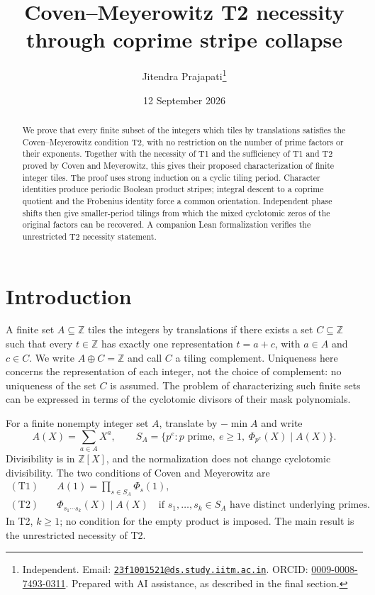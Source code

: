 \documentclass[11pt]{article}
\title{Coven--Meyerowitz T2 necessity\\through coprime stripe collapse}
\author{Jitendra Prajapati\thanks{Independent. Email: \href{mailto:23f1001521@ds.study.iitm.ac.in}{\texttt{23f1001521@ds.study.iitm.ac.in}}. ORCID: \href{https://orcid.org/0009-0008-7493-0311}{0009-0008-7493-0311}. Prepared with AI assistance, as described in the final section.}}
\date{12 September 2026}
\newcommand{\Z}{\mathbb Z}
\newcommand{\PhiC}{\Phi}
\begin{document}
\maketitle
\begin{abstract}
We prove that every finite subset of the integers which tiles by translations satisfies the Coven--Meyerowitz condition T2, with no restriction on the number of prime factors or their exponents. Together with the necessity of T1 and the sufficiency of T1 and T2 proved by Coven and Meyerowitz, this gives their proposed characterization of finite integer tiles. The proof uses strong induction on a cyclic tiling period. Character identities produce periodic Boolean product stripes; integral descent to a coprime quotient and the Frobenius identity force a common orientation. Independent phase shifts then give smaller-period tilings from which the mixed cyclotomic zeros of the original factors can be recovered. A companion Lean formalization verifies the unrestricted T2 necessity statement.
\end{abstract}

\section{Introduction}
A finite set $A\subseteq\Z$ tiles the integers by translations if there exists a set $C\subseteq\Z$ such that every $t\in\Z$ has exactly one representation $t=a+c$, with $a\in A$ and $c\in C$. We write $A\oplus C=\Z$ and call $C$ a tiling complement. Uniqueness here concerns the representation of each integer, not the choice of complement: no uniqueness of the set $C$ is assumed. The problem of characterizing such finite sets can be expressed in terms of the cyclotomic divisors of their mask polynomials.

For a finite nonempty integer set $A$, translate by $-\min A$ and write
\[
 A(X)=\sum_{a\in A}X^a,\qquad
 S_A=\{p^e:p\text{ prime},\ e\ge1,\ \PhiC_{p^e}(X)\mid A(X)\}.
\]
Divisibility is in $\Z[X]$, and the normalization does not change cyclotomic divisibility. The two conditions of Coven and Meyerowitz are
\begin{align*}
 \mathrm{(T1)}\quad & A(1)=\prod_{s\in S_A}\PhiC_s(1),\\
 \mathrm{(T2)}\quad & \PhiC_{s_1\cdots s_k}(X)\mid A(X)
 \quad\text{if }s_1,\ldots,s_k\in S_A\text{ have distinct underlying primes}.
\end{align*}
In T2, $k\ge1$; no condition for the empty product is imposed. The main result is the unrestricted necessity of T2.
\end{document}
